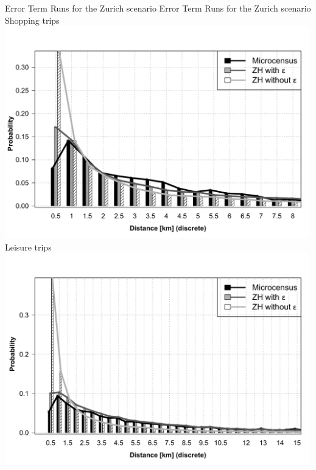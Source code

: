 \createfigure%
{Error Term Runs for the Zurich scenario}%
{Error Term Runs for the Zurich scenario}%
{\label{fig:zhLEGO}}%
{%
  \createsubfigure%
  {Shopping trips}%
	{\includegraphics[width=0.99\textwidth,angle=0]{extending/figures/dc/zhShopping.pdf}}%
  {\label{fig:zhShopping}}%
  {}%
   \createsubfigure%
  {Leisure trips}%
  {\includegraphics[width=0.99\textwidth,angle=0]{extending/figures/dc//zhLeisure.pdf}}%
  {\label{fig:zhLeisure}}%
  {}%
}%
{}

